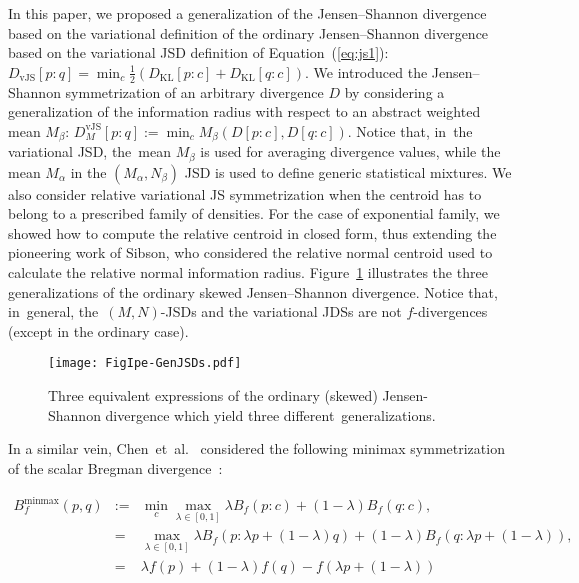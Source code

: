 \documentclass[entropy,article,accept,oneauthor,pdftex,entropy]{Definitions/mdpi}
\def\vJS{\mathrm{vJS}}
\def\KL{\mathrm{KL}}
\def\minmax{\mathrm{minmax}}
\begin{document}
\begin{paracol}{2}
In this paper, we proposed a generalization of the Jensen--Shannon divergence based on the variational definition of the ordinary Jensen--Shannon divergence based on the variational JSD definition of Equation~(\ref{eq:js1}): $D_\vJS[p:q]=\min_c \frac{1}{2}(D_\KL[p:c]+D_\KL[q:c])$.
We introduced the Jensen--Shannon symmetrization of an arbitrary divergence $D$ by considering a generalization of the information radius with respect to an abstract weighted mean $M_\beta$: $D^\vJS_M[p:q]:=\min_c M_\beta(D[p:c],D[q:c])$.
Notice that, in~the variational JSD, the~mean $M_\beta$ is used for averaging divergence values, while the mean $M_\alpha$ in the $(M_\alpha,N_\beta)$ JSD is used to define generic statistical mixtures.
We also consider relative variational JS symmetrization when the centroid has to belong to a prescribed family of densities.
For the case of exponential family, we showed how to compute the relative centroid in closed form, thus extending the pioneering work of Sibson, who considered the relative normal centroid used to calculate the relative normal information radius. 
Figure~\ref{fig:genJSdiag} illustrates the three generalizations of the ordinary skewed Jensen--Shannon divergence.
Notice that, in~general, the~$(M,N)$-JSDs and the variational JDSs are not $f$-divergences (except in the ordinary case).


\clearpage
\end{paracol}
\nointerlineskip
\begin{figure}[H]
\widefigure
\texttt{[image: FigIpe-GenJSDs.pdf]}
\caption{{Three equivalent expressions}
 of the ordinary (skewed) Jensen-Shannon divergence which yield three different~generalizations.\label{fig:genJSdiag}}
\end{figure}
\begin{paracol}{2}
\switchcolumn

In a similar vein, Chen~et~al.~\cite{Chen-BD2-2008} considered the following minimax symmetrization of the scalar Bregman divergence~\cite{Bregman-1967}:
\end{paracol}
\nointerlineskip
\begin{eqnarray}\label{eq:varbd}
B^\minmax_f(p,q) &:=& \min_c \max_{\lambda\in[0,1]} \lambda B_f(p:c)+(1-\lambda) B_f(q:c),\\
&=& \max_{\lambda\in[0,1]} \lambda B_f(p:\lambda p+(1-\lambda) q)+(1-\lambda) B_f(q:\lambda p+(1-\lambda)),\\
&=& \lambda f(p)+(1-\lambda)f(q)-f(\lambda p+(1-\lambda))
\end{eqnarray}
\end{document}
